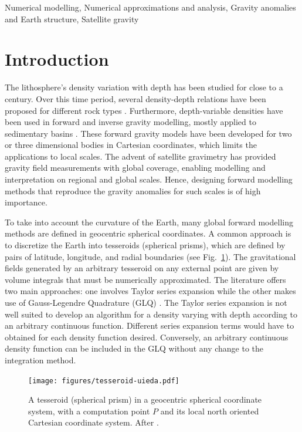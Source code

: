 \documentclass[extra, referee]{gji}
\begin{document}
\begin{keywords}
Numerical modelling, Numerical approximations and analysis, Gravity anomalies
and Earth structure, Satellite gravity
\end{keywords}


\section{Introduction}

The lithosphere's density variation with depth has been studied for close to a
century.
Over this time period,
several density-depth relations have been proposed for different rock types
\citep[e.g.,][]{Maxant1980, Rao1986, Rao1993, Rao1994}.
Furthermore, depth-variable densities have been used in forward and
inverse gravity modelling, mostly applied to sedimentary basins
\citep{Cordell1973, Rao1986, Cowie1990, Rao1993, Rao1994, Zhang2001,
Welford2010}.
These forward gravity models have been developed for two or three dimensional
bodies in Cartesian coordinates, which limits the applications to local scales.
The advent of satellite gravimetry has provided gravity field
measurements with global coverage, enabling modelling and interpretation on regional and
global scales.
Hence, designing forward modelling methods that reproduce the gravity anomalies for
such scales is of high importance.

To take into account the curvature of the Earth, many global forward modelling methods
are defined in geocentric spherical coordinates.
A common approach is to discretize the Earth into tesseroids (spherical prisms),
which are defined by pairs of latitude, longitude, and
radial boundaries (see Fig.~\ref{fig:tesseroid}).
The gravitational fields generated by an arbitrary
tesseroid on any external point are given by volume
integrals that must be numerically approximated.
The literature offers two main approaches: one involves Taylor series expansion
\citep{Heck2007, Grombein2013} while the other makes use of Gauss-Legendre
Quadrature (GLQ)
\citep{Asgharzadeh2007, Wild-Pfeiffer2008, Li2011, Uieda2016}.
The Taylor series expansion is not well suited to develop an algorithm for
a density varying with depth according to an arbitrary continuous function.
Different series expansion terms would have to obtained for each density function
desired.
Conversely, an arbitrary continuous density function can be included in the GLQ without
any change to the integration method.

\begin{figure}
\centering
\texttt{[image: figures/tesseroid-uieda.pdf]}
\caption{
    A tesseroid (spherical prism) in a geocentric spherical coordinate system, with a
    computation point $P$ and its local north oriented Cartesian coordinate system.
    After \citet{Uieda2015}.
}
\label{fig:tesseroid}
\end{figure}
\end{document}
